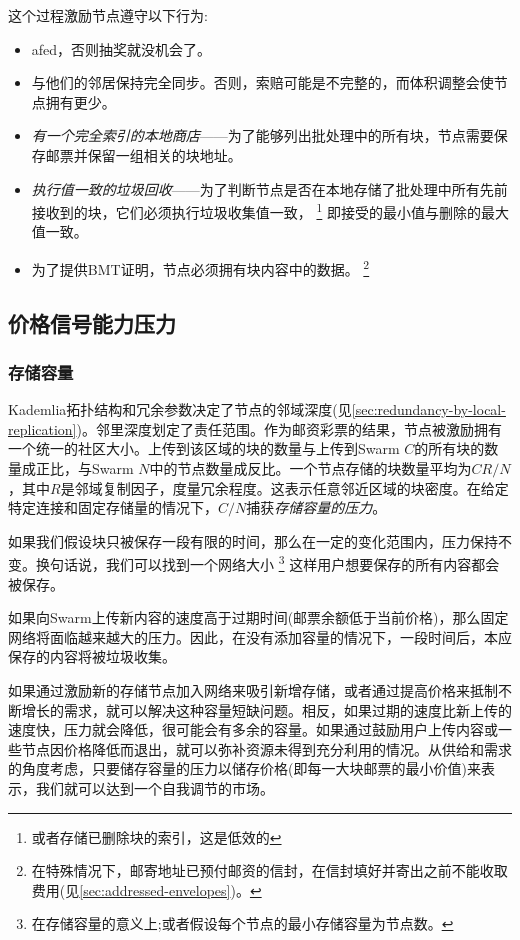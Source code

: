 这个过程激励节点遵守以下行为:

\begin{itemize}
\item afed，否则抽奖就没机会了。
\item 与他们的邻居保持完全同步。否则，索赔可能是不完整的，而体积调整会使节点拥有更少。
\item \emph{有一个完全索引的本地商店}——为了能够列出批处理中的所有块，节点需要保存邮票并保留一组相关的块地址。 
\item \emph{执行值一致的垃圾回收}——为了判断节点是否在本地存储了批处理中所有先前接收到的块，它们必须执行垃圾收集值一致，%
%
\footnote{或者存储已删除块的索引，这是低效的}
即接受的最小值与删除的最大值一致。
%
\item 为了提供BMT证明，节点必须拥有块内容中的数据。%
%
\footnote{在特殊情况下，邮寄地址已预付邮资的信封，在信封填好并寄出之前不能收取费用(见\ref{sec:addressed-envelopes})。}
\end{itemize}


\subsection{价格信号能力压力}\label{sec:capacity-pressure}

\yellow{}

\subsubsection{存储容量}
Kademlia拓扑结构和冗余参数决定了节点的邻域深度(见\ref{sec:redundancy-by-local-replication})。邻里深度划定了责任范围。作为邮资彩票的结果，节点被激励拥有一个统一的社区大小。上传到该区域的块的数量与上传到Swarm $C$的所有块的数量成正比，与Swarm $N$中的节点数量成反比。一个节点存储的块数量平均为$CR/N$，其中$R$是邻域复制因子，度量冗余程度。这表示任意邻近区域的块密度。在给定特定连接和固定存储量的情况下，$C/N$捕获\emph{存储容量的压力}。 

如果我们假设块只被保存一段有限的时间，那么在一定的变化范围内，压力保持不变。换句话说，我们可以找到一个网络大小%
%
\footnote{在存储容量的意义上;或者假设每个节点的最小存储容量为节点数。}
%
这样用户想要保存的所有内容都会被保存。 

如果向Swarm上传新内容的速度高于过期时间(邮票余额低于当前价格)，那么固定网络将面临越来越大的压力。因此，在没有添加容量的情况下，一段时间后，本应保存的内容将被垃圾收集。 

如果通过激励新的存储节点加入网络来吸引新增存储，或者通过提高价格来抵制不断增长的需求，就可以解决这种容量短缺问题。相反，如果过期的速度比新上传的速度快，压力就会降低，很可能会有多余的容量。如果通过鼓励用户上传内容或一些节点因价格降低而退出，就可以弥补资源未得到充分利用的情况。从供给和需求的角度考虑，只要储存容量的压力以储存价格(即每一大块邮票的最小价值)来表示，我们就可以达到一个自我调节的市场。 

